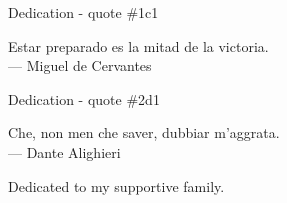\thispagestyle{empty}
{}

\vspace*{3cm}

\begin{ocg}{Dedication - quote \#1}{c}{1}

\begin{center}
    Estar preparado es la mitad de la victoria.\\ \medskip
    --- Miguel de Cervantes
\end{center}

\end{ocg}

\medskip

\begin{ocg}{Dedication - quote \#2}{d}{1}

\begin{center}
    Che, non men che saver, dubbiar m'aggrata.\\ \medskip
    --- Dante Alighieri
\end{center}

\end{ocg}

\bigskip

\begin{center}
    Dedicated to my supportive family.
\end{center}
